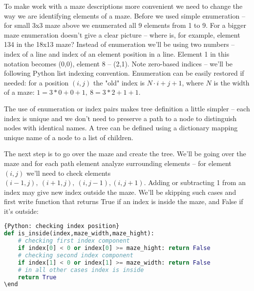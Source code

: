 To make work with a maze descriptions more convenient we need to
change the way we are identifying elements of a maze. Before we
used simple enumeration -- for small 3x3 maze above we enumerated all
9 elements from 1 to 9. For a bigger maze enumeration doesn't give a
clear picture -- where is, for example, element 134 in the 18x13 maze?
 Instead of enumeration we'll be using two numbers -- index of a line
and index of an element position in a line. Element 1 in this notation
becomes (0,0), element 8 -- (2,1). Note zero-based indices -- we'll be
following Python list indexing convention. Enumeration can be easily
restored if needed: for a position $(i,j)$ the "old" 
index is $N\cdot i+j+1$,
where $N$ is the width of a maze: $1=3*0+0+1,\ 8=3*2+1+1$.

The use of enumeration or index pairs makes tree definition 
a little simpler --
each index is unique and we don't need to preserve a path to a node to
distinguish nodes with identical names. A tree can be defined using a
dictionary mapping unique name of a node to a list of children.

The next step is to go over the maze and create the tree. We'll be
going over the maze and for each path element analyze 
surrounding elements --
for element $(i,j)$ we'll need to check elements
$(i-1,j),\ (i+1,j),\ (i,j-1), (i,j+1)$. Adding or subtracting 1
from an index may give new index outside the maze. We'll be
skipping such cases and first write function that returns True
if an index is inside the maze, and False if it's outside:

\begin{lstlisting}[language=Python,style=codelst]{Python: checking index position}
def is_inside(index,maze_width,maze_hight):
    # checking first index component
    if index[0] < 0 or index[0] >= maze_hight: return False
    # checking second index component
    if index[1] < 0 or index[1] >= maze_width: return False
    # in all other cases index is inside
    return True
\end
\end{lstlisting}

